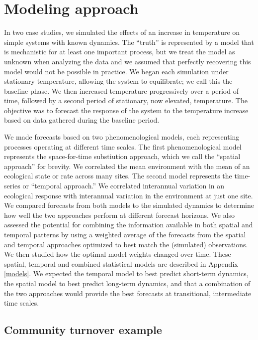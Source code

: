 \documentclass[11pt]{article}
\begin{document}
\section*{Modeling approach}

In two case studies, we simulated the effects of an increase in temperature on simple systems with known dynamics.
The ``truth'' is represented by a model that is mechanistic for at least one important process, but we treat the model as unknown when
analyzing the data and we assumed that perfectly recovering this model would not be possible in practice. We began each simulation
under stationary temperature, allowing the system to equilibrate; we call this the baseline phase. 
We then increased temperature progressively over a period of time, followed by a second period of stationary, now elevated, temperature. 
The objective was to forecast the response of the system to the temperature increase based on data gathered during the baseline period. 

We made forecasts based on two phenomenological models, each representing processes operating at different time scales. 
The first phenomenological model represents the space-for-time substiution approach, which we call the ``spatial approach'' for brevity. 
We correlated the mean environment with the mean of an ecological state or rate across many sites. The second model represents the time-series or ``temporal approach.'' We correlated interannual variation in an ecological response with interannual variation in the environment at just one site. 
We compared forecasts from both models to the simulated dynamics to determine how well the two approaches perform at different forecast horizons. We also assessed the potential for combining the information available in both spatial and temporal patterns by using a weighted average of the forecasts from the spatial and temporal approaches optimized to best match the (simulated) observations. We then studied how the optimal model weights changed over time. These spatial, temporal and combined statistical
models are described in Appendix \ref{models}. We expected the temporal model to best predict short-term dynamics, the spatial model to best predict long-term dynamics, and that a combination of the two approaches would provide the best forecasts at transitional, intermediate time scales.

\subsection*{Community turnover example}
\end{document}
